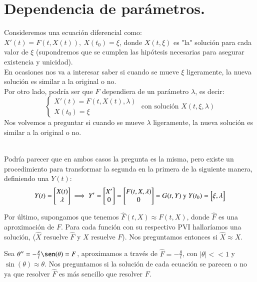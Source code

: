 \section{Dependencia de parámetros.} %

Consideremos una ecuación diferencial como: $X'(t) = F(t, X(t)),\ X(t_0) = \xi$, donde $X(t, \xi)$ es "la" solución para cada valor de $\xi$ (supondremos que se cumplen las hipótesis necesarias para asegurar existencia y unicidad).\\
En ocasiones nos va a interesar saber si cuando se mueve $\xi$ ligeramente, la nueva solución es similar a la original o no.\\
Por otro lado, podría ser que $F$ dependiera de un parámetro $\lambda$, es decir:
$$
    \begin{cases}
        X'(t) = F(t, X(t), \lambda)\\
        X(t_0) = \xi
    \end{cases} \text{ con solución } X(t, \xi, \lambda)
$$
Nos volvemos a preguntar si cuando se mueve $\lambda$ ligeramente, la nueva solución es similar a la original o no.\\\\
\begin{obs}
    Podría parecer que en ambos casos la pregunta es la misma, pero existe un procedimiento para transformar la segunda en la primera de la siguiente manera, definiendo una $Y(t)$:
    $$
        Y(t) = \mx{X(t)\\\lambda} \implies Y' = \mx{X'\\0} = \mx{F(t, X, \lambda)\\0} = G(t, Y) \text{ y } Y(t_0) = \mx{\xi, \lambda}
    $$
\end{obs}
Por último, supongamos que tenemos $\hat{F}(t, X) \approx F(t, X)$, donde $\hat{F}$ es una aproximación de $F$. Para cada función con su respectivo PVI hallaríamos una solución, ($\hat{X}$ resuelve $\hat{F}$ y $X$ resuelve $F$). Nos preguntamos entonces si $\hat{X} \approx X$.

\begin{eg}
    Sea $\theta''=-\frac{g}{l}\sen(\theta) = F$, aproximamos a través de $\hat{F} = -\frac{g}{l}$, con $|\theta| << 1$ y $\sin(\theta) \approx \theta$. Nos preguntamos si la solución de cada ecuación se parecen o no ya que resolver $\hat{F}$ es más sencillo que resolver $F$.
\end{eg}

